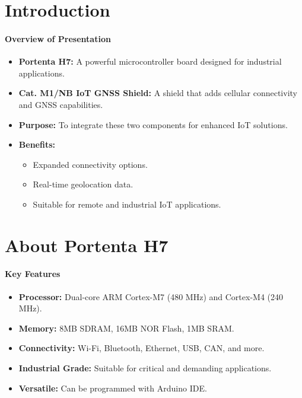 %
%
%
%



\section{Introduction}

{
	  \framesubtitle{Overview of Presentation}
\begin{itemize}
	\item \textbf{Portenta H7:} A powerful microcontroller board designed for industrial applications.
	\item \textbf{Cat. M1/NB IoT GNSS Shield:} A shield that adds cellular connectivity and GNSS capabilities.
	\item \textbf{Purpose:} To integrate these two components for enhanced IoT solutions.
	\item \textbf{Benefits:}
	\begin{itemize}
		\item Expanded connectivity options.
		\item Real-time geolocation data.
		\item Suitable for remote and industrial IoT applications.
	\end{itemize}
\end{itemize}
}

\section{About Portenta H7}
{
		  \framesubtitle{Key Features}
\begin{itemize}
	\item \textbf{Processor:} Dual-core ARM Cortex-M7 (480 MHz) and Cortex-M4 (240 MHz).
	\item \textbf{Memory:} 8MB SDRAM, 16MB NOR Flash, 1MB SRAM.
	\item \textbf{Connectivity:} Wi-Fi, Bluetooth, Ethernet, USB, CAN, and more.
	\item \textbf{Industrial Grade:} Suitable for critical and demanding applications.
	\item \textbf{Versatile:} Can be programmed with Arduino IDE.
\end{itemize}
}

